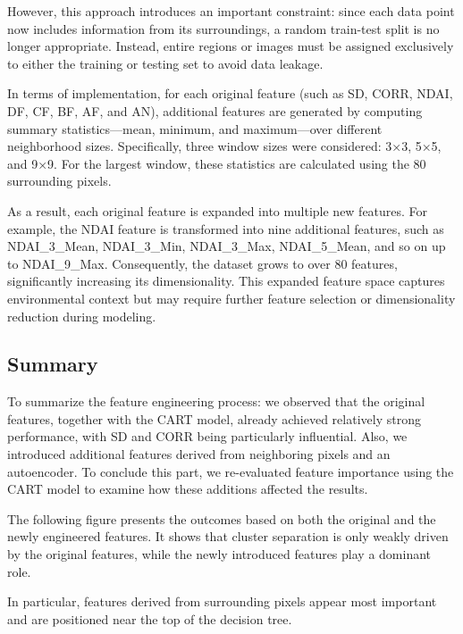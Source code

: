 \documentclass[10pt,letterpaper]{article}
\begin{document}
However, this approach introduces an important constraint: since each data point now includes information from its surroundings, a random train-test split is no longer appropriate. Instead, entire regions or images must be assigned exclusively to either the training or testing set to avoid data leakage.

In terms of implementation, for each original feature (such as SD, CORR, NDAI, DF, CF, BF, AF, and AN), additional features are generated by computing summary statistics—mean, minimum, and maximum—over different neighborhood sizes. Specifically, three window sizes were considered: 3×3, 5×5, and 9×9. For the largest window, these statistics are calculated using the 80 surrounding pixels.

As a result, each original feature is expanded into multiple new features. For example, the NDAI feature is transformed into nine additional features, such as NDAI\_3\_Mean, NDAI\_3\_Min, NDAI\_3\_Max, NDAI\_5\_Mean, and so on up to NDAI\_9\_Max. Consequently, the dataset grows to over 80 features, significantly increasing its dimensionality. This expanded feature space captures environmental context but may require further feature selection or dimensionality reduction during modeling.

\subsection{Summary}

To summarize the feature engineering process:  we observed that the original features, together with the CART model, already achieved relatively strong performance, with SD and CORR being particularly influential. Also, we introduced additional features derived from neighboring pixels and an autoencoder. To conclude this part, we re-evaluated feature importance using the CART model to examine how these additions affected the results.

The following figure presents the outcomes based on both the original and the newly engineered features. It shows that cluster separation is only weakly driven by the original features, while the newly introduced features play a dominant role. 

In particular, features derived from surrounding pixels appear most important and are positioned near the top of the decision tree. 
\end{document}
